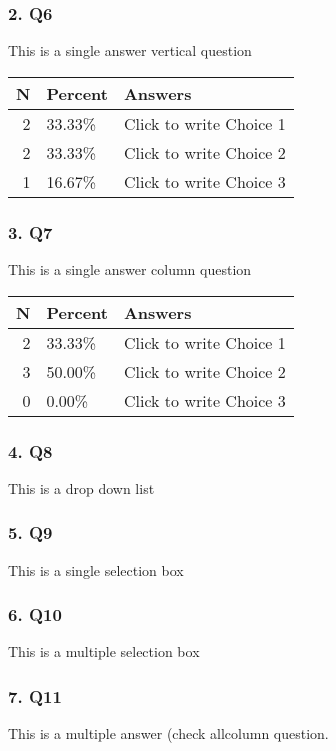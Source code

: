 \documentclass{article}\usepackage[]{graphicx}\usepackage[]{color}
\begin{document}
\hfill \break \hfill \break
\subsubsection*{2. Q6}
This is a single answer vertical question

\begin{tabular}{r|l|l}
\hline
N & Percent & Answers\\
\hline
2 & 33.33\% & Click to write Choice 1\\
\hline
2 & 33.33\% & Click to write Choice 2\\
\hline
1 & 16.67\% & Click to write Choice 3\\
\hline
\end{tabular}


\hfill \break \hfill \break
\subsubsection*{3. Q7}
This is a single answer column question

\begin{tabular}{r|l|l}
\hline
N & Percent & Answers\\
\hline
2 & 33.33\% & Click to write Choice 1\\
\hline
3 & 50.00\% & Click to write Choice 2\\
\hline
0 & 0.00\% & Click to write Choice 3\\
\hline
\end{tabular}


\hfill \break \hfill \break
\subsubsection*{4. Q8}
This is a drop down list

\hfill \break \hfill \break
\subsubsection*{5. Q9}
This is a single selection box

\hfill \break \hfill \break
\subsubsection*{6. Q10}
This is a multiple selection box

\hfill \break \hfill \break
\subsubsection*{7. Q11}
This is a multiple answer (check allcolumn question.
\end{document}
